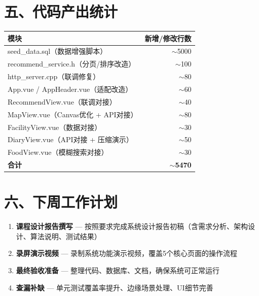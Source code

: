 \documentclass[12pt,a4paper]{article}
\begin{document}
\section*{五、代码产出统计}

\begin{center}
\begin{tabular}{l r}
    \toprule
    \bfseries 模块 & \bfseries 新增/修改行数 \\
    \midrule
    seed\_data.sql（数据增强脚本） & $\sim$5000 \\
    recommend\_service.h（分页/排序改造） & $\sim$100 \\
    http\_server.cpp（联调修复） & $\sim$80 \\
    App.vue / AppHeader.vue（适配改造） & $\sim$60 \\
    RecommendView.vue（联调对接） & $\sim$40 \\
    MapView.vue（Canvas优化 + API对接） & $\sim$80 \\
    FacilityView.vue（数据对接） & $\sim$30 \\
    DiaryView.vue（API对接 + 压缩演示） & $\sim$50 \\
    FoodView.vue（模糊搜索对接） & $\sim$30 \\
    \midrule
    \textbf{合计} & \textbf{$\sim$5470} \\
    \bottomrule
\end{tabular}
\end{center}

\section*{六、下周工作计划}

\begin{enumerate}[leftmargin=2em]
    \item \textbf{课程设计报告撰写} — 按照要求完成系统设计报告初稿（含需求分析、架构设计、算法说明、测试结果）
    \item \textbf{录屏演示视频} — 录制系统功能演示视频，覆盖5个核心页面的操作流程
    \item \textbf{最终验收准备} — 整理代码、数据库、文档，确保系统可正常运行
    \item \textbf{查漏补缺} — 单元测试覆盖率提升、边缘场景处理、UI细节完善
\end{enumerate}
\end{document}
